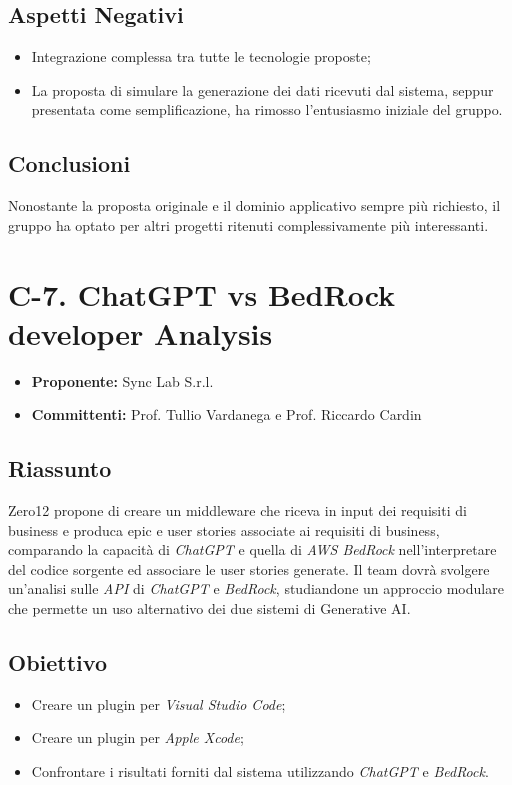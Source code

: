 \documentclass{article}
\begin{document}
\subsection{Aspetti Negativi}
\begin{itemize}
    \item Integrazione complessa tra tutte le tecnologie proposte;
    \item La proposta di simulare la generazione dei dati ricevuti dal sistema, seppur presentata come semplificazione, ha rimosso l’entusiasmo iniziale del gruppo.

\end{itemize}
\subsection{Conclusioni}
Nonostante la proposta originale e il dominio applicativo sempre più richiesto, il gruppo ha optato per altri progetti ritenuti complessivamente più interessanti.


\newpage
\section{C-7. ChatGPT vs BedRock developer Analysis}
\begin{itemize}
    \item \textbf{Proponente:} Sync Lab S.r.l.
    \item \textbf{Committenti:}  Prof. Tullio Vardanega e Prof. Riccardo Cardin
\end{itemize}

\subsection{Riassunto}
Zero12 propone di creare un middleware che riceva in input dei requisiti di business e produca epic e user stories associate ai requisiti di business, comparando la capacità di \textit{ChatGPT} e quella di \textit{AWS BedRock} nell’interpretare del codice sorgente ed associare le user stories generate.
Il team dovrà svolgere un’analisi sulle \textit{API} di \textit{ChatGPT} e \textit{BedRock}, studiandone un approccio modulare che permette un uso alternativo dei due sistemi di Generative AI.


\subsection{Obiettivo}
\begin{itemize}
    \item Creare un plugin per \textit{Visual Studio Code};
    \item Creare un plugin per \textit{Apple Xcode};
    \item Confrontare i risultati forniti dal sistema utilizzando \textit{ChatGPT} e \textit{BedRock}.
\end{itemize}
\end{document}
